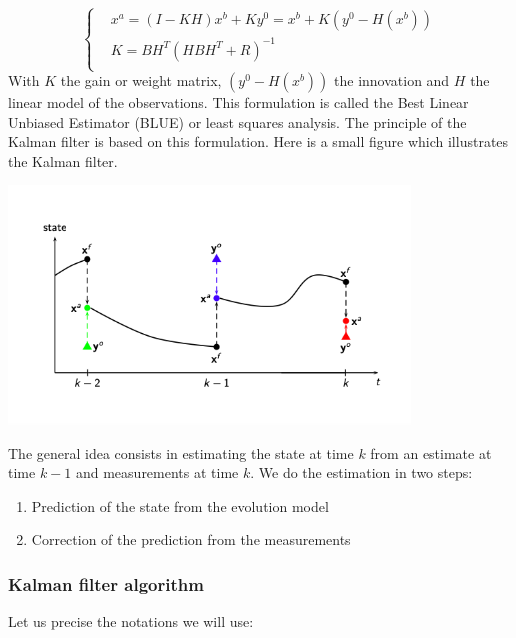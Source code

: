 $$\left\{\begin{aligned}
		&x^a=(I-KH)x^b+Ky^0=x^b+K(y^0-H(x^b)) \\
        &K=BH^T(HBH^T+R)^{-1} \\
	\end{aligned}\right.$$
With $K$ the gain or weight matrix, $(y^0-H(x^b))$ the innovation and $H$ the linear model of the observations.
This formulation is called the Best Linear Unbiased Estimator (BLUE) or least squares analysis.
The principle of the Kalman filter is based on this formulation. Here is a small figure which illustrates the Kalman filter.
\vspace*{5mm}
\begin{center}
		\includegraphics[width=0.8\textwidth]{"images/schema_kalman_filter.png"}
	\end{center}
The general idea consists in estimating the state at time $k$ from an estimate at time $k-1$ and measurements at time $k$.
We do the estimation in two steps:
\begin{enumerate}[label=\textbullet]
		\item Prediction of the state from the evolution model
		\item Correction of the prediction from the measurements
	\end{enumerate}

\subsubsection{Kalman filter algorithm}
Let us precise the notations we will use:


